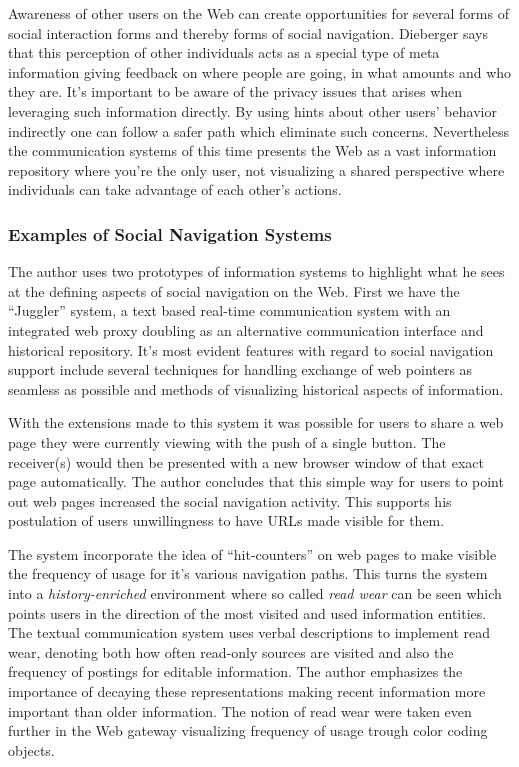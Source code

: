 \documentclass[12pt,a4paper]{article}
\begin{document}
Awareness of other users on the Web can create opportunities for several forms
of social interaction forms and thereby forms of social navigation. Dieberger
says that this perception of other individuals acts as a special type of meta
information giving feedback on where people are going, in what amounts and
who they are. It's important to be aware of the privacy issues that arises
when leveraging such information directly. By using hints about other users'
behavior indirectly one can follow a safer path which eliminate such
concerns. Nevertheless the communication systems of this time presents the Web
as a vast information repository where you're the only user, not visualizing a
shared perspective where individuals can take advantage of each other's
actions.

\subsubsection{Examples of Social Navigation Systems}

The author uses two prototypes of information systems to highlight what he
sees at the defining aspects of social navigation on the Web. First we have
the ``Juggler'' system, a text based real-time communication system
with an integrated web proxy doubling as an alternative communication
interface and historical repository. It's most evident features with
regard to social navigation support include several techniques for handling
exchange of web pointers as seamless as possible and methods of visualizing
historical aspects of information.

With the extensions made to this system it was possible for users to share a
web page they were currently viewing with the push of a single button. The
receiver(s) would then be presented with a new browser window of that exact
page automatically. The author concludes that this simple way for users to
point out web pages increased the social navigation activity.
This supports his postulation of users unwillingness to have URLs made visible
for them.

The system incorporate the idea of ``hit-counters'' on web pages
to make visible the frequency of usage for it's various navigation paths. This
turns the system into a \emph{history-enriched} \cite{hill94}
environment where so called
\emph{read wear} \cite{hill92} can be seen which points users in the direction
of the most visited and used information entities. The textual communication
system uses verbal descriptions to implement read wear, denoting both how often
read-only sources are visited and also the frequency of postings for editable
information. The author emphasizes the importance of decaying these
representations making recent information more important than older
information. The notion of read wear were taken even further in the Web
gateway visualizing frequency of usage trough color coding objects.
\end{document}
